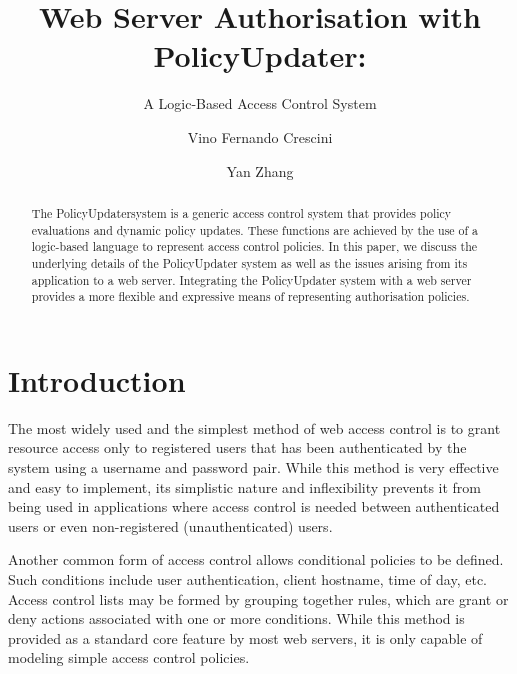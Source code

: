 \documentclass[11pt]{llncs}
\begin{document}
  \title{Web Server Authorisation with PolicyUpdater:}
  \subtitle{A Logic-Based Access Control System}

  \author{Vino Fernando Crescini \and Yan Zhang}


  \maketitle

  \begin{abstract}
    The PolicyUpdater\footnotemark system is a generic access control system
    that provides policy evaluations and dynamic policy updates. These
    functions are achieved by the use of a logic-based language to represent
    access control policies. In this paper, we discuss the underlying details
    of the PolicyUpdater system as well as the issues arising from its
    application to a web server. Integrating the PolicyUpdater system with a
    web server provides a more flexible and expressive means of representing
    authorisation policies.
  \end{abstract}


  \section{Introduction}

    The most widely used and the simplest method of web access control is to
    grant resource access only to registered users that has been authenticated
    by the system using a username and password pair. While this method is very
    effective and easy to implement, its simplistic nature and inflexibility
    prevents it from being used in applications where access control is needed
    between authenticated users or even non-registered (unauthenticated) users.

    Another common form of access control allows conditional policies to be
    defined. Such conditions include user authentication, client hostname, time
    of day, etc. Access control lists may be formed by grouping together rules,
    which are grant or deny actions associated with one or more conditions.
    While this method is provided as a standard core feature by most web
    servers, it is only capable of modeling simple access control policies.
\end{document}
